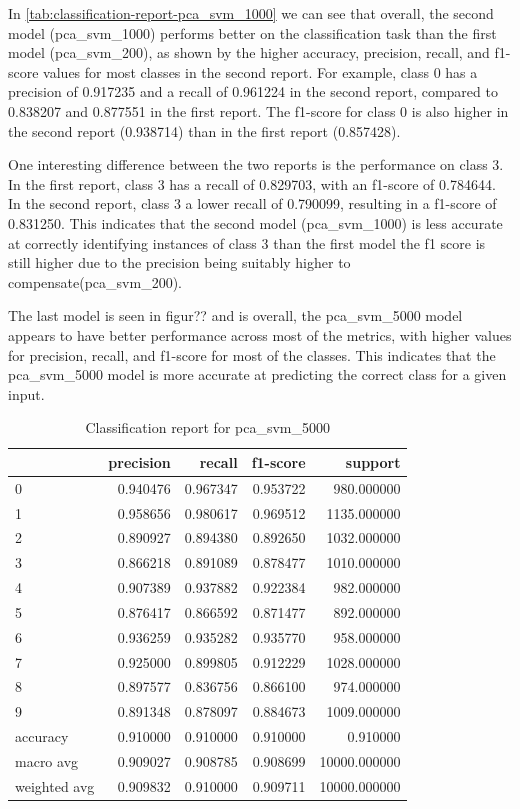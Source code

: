 In \ref{tab:classification-report-pca_svm_1000} we can see that overall, the second model (pca_svm_1000) performs better on the classification task than the first model (pca_svm_200), as shown by the higher accuracy, precision, recall, and f1-score values for most classes in the second report. For example, class 0 has a precision of 0.917235 and a recall of 0.961224 in the second report, compared to 0.838207 and 0.877551 in the first report. The f1-score for class 0 is also higher in the second report (0.938714) than in the first report (0.857428).

One interesting difference between the two reports is the performance on class 3. In the first report, class 3 has a recall of 0.829703, with an f1-score of 0.784644. In the second report, class 3 a lower recall of 0.790099, resulting in a f1-score of 0.831250. This indicates that the second model (pca_svm_1000) is less accurate at correctly identifying instances of class 3 than the first model the f1 score is still higher due to the precision being suitably higher to compensate(pca_svm_200).

The last model is seen in figur?? and is overall, the pca_svm_5000 model appears to have better performance across most of the metrics, with higher values for precision, recall, and f1-score for most of the classes. This indicates that the pca_svm_5000 model is more accurate at predicting the correct class for a given input.

\begin{table}[htb!]
    \centering
    \caption{Classification report for pca_svm_5000}
    \label{tab:classification-report-pca_svm_5000}
    \begin{tabular}{lrrrr}
    \toprule
    & precision & recall & f1-score & support \\
    \midrule
    0 & 0.940476 & 0.967347 & 0.953722 & 980.000000 \\
    1 & 0.958656 & 0.980617 & 0.969512 & 1135.000000 \\
    2 & 0.890927 & 0.894380 & 0.892650 & 1032.000000 \\
    3 & 0.866218 & 0.891089 & 0.878477 & 1010.000000 \\
    4 & 0.907389 & 0.937882 & 0.922384 & 982.000000 \\
    5 & 0.876417 & 0.866592 & 0.871477 & 892.000000 \\
    6 & 0.936259 & 0.935282 & 0.935770 & 958.000000 \\
    7 & 0.925000 & 0.899805 & 0.912229 & 1028.000000 \\
    8 & 0.897577 & 0.836756 & 0.866100 & 974.000000 \\
    9 & 0.891348 & 0.878097 & 0.884673 & 1009.000000 \\
    accuracy & 0.910000 & 0.910000 & 0.910000 & 0.910000 \\
    macro avg & 0.909027 & 0.908785 & 0.908699 & 10000.000000 \\
    weighted avg & 0.909832 & 0.910000 & 0.909711 & 10000.000000 \\
    \bottomrule
    \end{tabular}
    \end{table}


